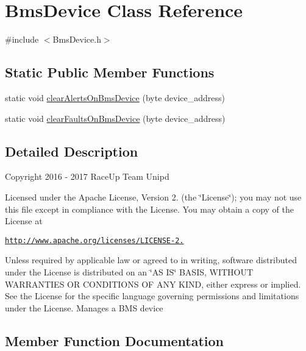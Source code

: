 \hypertarget{class_bms_device}{}\section{Bms\+Device Class Reference}
\label{class_bms_device}


{\ttfamily \#include $<$Bms\+Device.\+h$>$}

\subsection*{Static Public Member Functions}
\begin{DoxyCompactItemize}
\item 
static void \hyperlink{class_bms_device_a6f8832d9d4211aca63fae77444262a16}{clear\+Alerts\+On\+Bms\+Device} (byte device\+\_\+address)
\item 
static void \hyperlink{class_bms_device_a26155b471a97e1bd96485f2e95934a11}{clear\+Faults\+On\+Bms\+Device} (byte device\+\_\+address)
\end{DoxyCompactItemize}


\subsection{Detailed Description}
Copyright 2016 -\/ 2017 Race\+Up Team Unipd

Licensed under the Apache License, Version 2. (the \char`\"{}\+License\char`\"{}); you may not use this file except in compliance with the License. You may obtain a copy of the License at

\href{http://www.apache.org/licenses/LICENSE-2.0}{\tt http\+://www.\+apache.\+org/licenses/\+L\+I\+C\+E\+N\+S\+E-\/2.}

Unless required by applicable law or agreed to in writing, software distributed under the License is distributed on an \char`\"{}\+A\+S I\+S\char`\"{} B\+A\+S\+IS, W\+I\+T\+H\+O\+UT W\+A\+R\+R\+A\+N\+T\+I\+ES OR C\+O\+N\+D\+I\+T\+I\+O\+NS OF A\+NY K\+I\+ND, either express or implied. See the License for the specific language governing permissions and limitations under the License. Manages a B\+MS device 

\subsection{Member Function Documentation}
